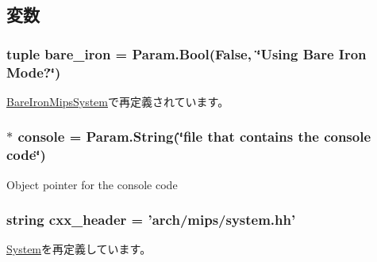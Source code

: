 \subsection{変数}
\hypertarget{classMipsSystem_1_1MipsSystem_a6e15ba3272e38d8deffaf29ebfd4bf58}{
\subsubsection[{bare\_\-iron}]{\setlength{\rightskip}{0pt plus 5cm}tuple bare\_\-iron = Param.Bool(False, \char`\"{}Using Bare Iron Mode?\char`\"{})}}
\label{classMipsSystem_1_1MipsSystem_a6e15ba3272e38d8deffaf29ebfd4bf58}


\hyperlink{classMipsSystem_1_1BareIronMipsSystem_a600ac10fe4fa7eb6168fcdf31a513b95}{BareIronMipsSystem}で再定義されています。\hypertarget{classMipsSystem_1_1MipsSystem_adaeebf25942c40e39b43056608af1c51}{
\subsubsection[{console}]{ $\ast$ {\bf console} = Param.String(\char`\"{}file that contains the {\bf console} code\char`\"{})}}
\label{classMipsSystem_1_1MipsSystem_adaeebf25942c40e39b43056608af1c51}
Object pointer for the console code \hypertarget{classMipsSystem_1_1MipsSystem_a17da7064bc5c518791f0c891eff05fda}{
\subsubsection[{cxx\_\-header}]{\setlength{\rightskip}{0pt plus 5cm}string cxx\_\-header = 'arch/mips/system.hh'}}
\label{classMipsSystem_1_1MipsSystem_a17da7064bc5c518791f0c891eff05fda}


\hyperlink{classSystem_1_1System_a17da7064bc5c518791f0c891eff05fda}{System}を再定義しています。

